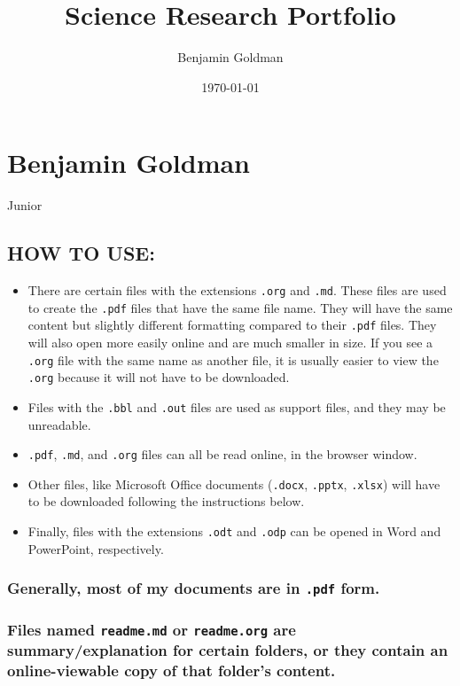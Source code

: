 \documentclass[11pt]{article}
\author{Benjamin Goldman}
\date{\today}
\title{Science Research Portfolio}
\begin{document}
\maketitle
\tableofcontents


\section{Benjamin Goldman}
\label{sec:org550ec5c}
Junior

\subsection{HOW TO USE:}
\label{sec:org3a9c09e}

\begin{itemize}
\item There are certain files with the extensions \texttt{.org} and \texttt{.md}. These files are used to create the \texttt{.pdf} files that have the same file name. They will have the same content but slightly different formatting compared to their \texttt{.pdf} files. They will also open more easily online and are much smaller in size. If you see a \texttt{.org} file with the same name as another file, it is usually easier to view the \texttt{.org} because it will not have to be downloaded.
\item Files with the \texttt{.bbl} and \texttt{.out} files are used as support files, and they may be unreadable.
\item \texttt{.pdf}, \texttt{.md}, and \texttt{.org} files can all be read online, in the browser window.
\item Other files, like Microsoft Office documents (\texttt{.docx}, \texttt{.pptx}, \texttt{.xlsx}) will have to be downloaded following the instructions below.
\item Finally, files with the extensions \texttt{.odt} and \texttt{.odp} can be opened in Word and PowerPoint, respectively.
\end{itemize}

\subsubsection{Generally, most of my documents are in \texttt{.pdf} form.}
\label{sec:org411472b}

\subsubsection{Files named \texttt{readme.md} or \texttt{readme.org} are summary/explanation for certain folders, or they contain an online-viewable copy of that folder's content.}
\label{sec:org4241669}
\end{document}
